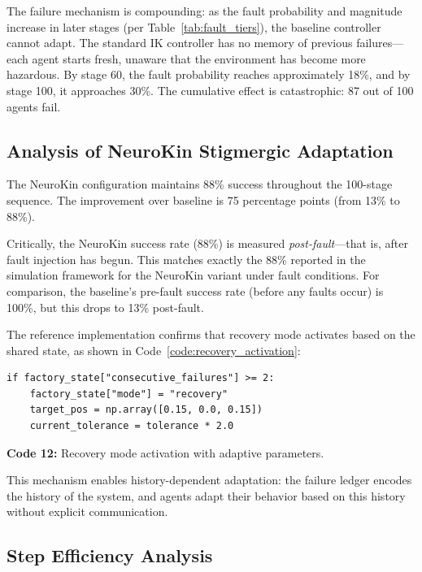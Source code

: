 \documentclass[12pt,a4paper,oneside]{report}
\begin{document}
The failure mechanism is compounding: as the fault probability and magnitude increase in later stages (per Table~\ref{tab:fault_tiers}), the baseline controller cannot adapt. The standard IK controller has no memory of previous failures—each agent starts fresh, unaware that the environment has become more hazardous. By stage 60, the fault probability reaches approximately 18\%, and by stage 100, it approaches 30\%. The cumulative effect is catastrophic: 87 out of 100 agents fail.

\subsection{Analysis of NeuroKin Stigmergic Adaptation}
\label{subsec:analysis_of_neurokin_stigmergic_adaptation}

The NeuroKin configuration maintains 88\% success throughout the 100-stage sequence. The improvement over baseline is 75 percentage points (from 13\% to 88\%).

Critically, the NeuroKin success rate (88\%) is measured \textit{post-fault}—that is, after fault injection has begun. This matches exactly the 88\% reported in the simulation framework for the NeuroKin variant under fault conditions. For comparison, the baseline's pre-fault success rate (before any faults occur) is 100\%, but this drops to 13\% post-fault.

The reference implementation confirms that recovery mode activates based on the shared state, as shown in Code~\ref{code:recovery_activation}:

{\small
\begin{verbatim}
if factory_state["consecutive_failures"] >= 2:
    factory_state["mode"] = "recovery"
    target_pos = np.array([0.15, 0.0, 0.15])
    current_tolerance = tolerance * 2.0
\end{verbatim}
}
\vspace{0.2cm}
{\small \textbf{Code 12:} Recovery mode activation with adaptive parameters.\label{code:recovery_activation}}
\vspace{0.3cm}

This mechanism enables history-dependent adaptation: the failure ledger encodes the history of the system, and agents adapt their behavior based on this history without explicit communication.

\subsection{Step Efficiency Analysis}
\label{subsec:step_efficiency_analysis}
\end{document}
